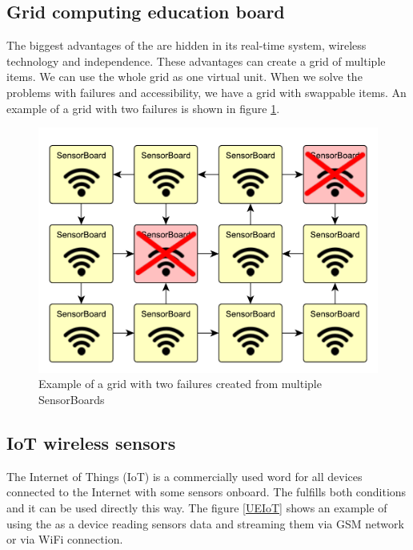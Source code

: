 \subsection{Grid computing education board}
\label{ExampleGrid}
The biggest advantages of the  are hidden in its real-time system, wireless technology and independence. These advantages can create a grid of multiple items. We can use the whole grid as one virtual unit. When we solve the problems with failures and accessibility, we have a grid with swappable items. An example of a grid with two failures is shown in figure \ref{UEgrid}.

\begin{figure}
    \centering
    \caption{Example of a grid with two failures created from multiple SensorBoards}
    \label{UEgrid}
    \includegraphics[width=\linewidth]{img/UsageExamplesGrid.pdf}
\end{figure}

\subsection{\ac{IoT} wireless sensors}
The Internet of Things (\ac{IoT}) is a commercially used word for all devices connected to the Internet with some sensors onboard. The  fulfills both conditions and it can be used directly this way. The figure \ref{UEIoT} shows an example of using the  as a device reading sensors data and streaming them via GSM network or via WiFi connection.


